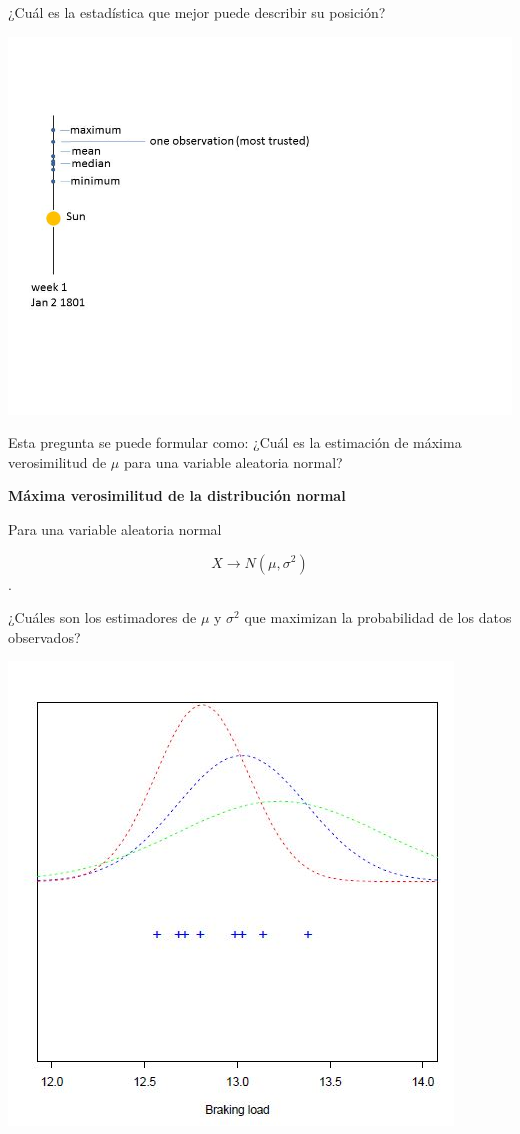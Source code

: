 \documentclass[
]{book}
\begin{document}
¿Cuál es la estadística que mejor puede describir su posición?

\includegraphics{./figures/cerestime.JPG}

Esta pregunta se puede formular como: ¿Cuál es la estimación de máxima verosimilitud de \(\mu\) para una variable aleatoria normal?

\textbf{Máxima verosimilitud de la distribución normal}

Para una variable aleatoria normal

\[X \rightarrow N(\mu, \sigma^2)\].

¿Cuáles son los estimadores de \(\mu\) y \(\sigma^2\) que maximizan la probabilidad de los datos observados?

\includegraphics{./figures/normpar.JPG}
\end{document}
